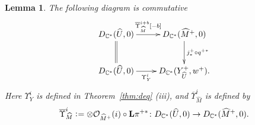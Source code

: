 \documentclass[11pt]{amsart}
\theoremstyle{plain}
\newtheorem{lem}[thm]{Lemma}
\newcommand{\oO}{\mathcal{O}}
\newcommand{\dL}{\mathbf{L}}
\begin{document}
\begin{lem}\label{lem:commute3}
The following diagram is commutative
\begin{align}\label{dia:commute3}
\xymatrix{
D_{\mathbb{C}^{\ast}}(\widehat{U}, 0)
\ar[r]^-{\overline{\Upsilon}_{\widehat{M}}^{i+b}[-b]} \ar@{=}[d] & D_{\mathbb{C}^{\ast}}(\widehat{M}^{+}, 0) 
\ar[d]^-{j^{+}_{\ast}\circ q^{+\ast}} \\
D_{\mathbb{C}^{\ast}}(\widehat{U}, 0) \ar[r]_-{\Upsilon_Y^i} & 
D_{\mathbb{C}^{\ast}}(Y_{\widehat{U}}^+, w^+).
}
\end{align}
Here $\Upsilon_Y^i$ is defined in Theorem~\ref{thm:deq} (iii), 
and $\overline{\Upsilon}_{\widehat{M}}^i$ is defined by
\begin{align}\label{UMi}
\overline{\Upsilon}_{\widehat{M}}^i 
\cneq \otimes \oO_{\widehat{M}^{+}}(i) \circ \dL \pi^{+\ast} \colon 
D_{\mathbb{C}^{\ast}}(\widehat{U}, 0) \to 
D_{\mathbb{C}^{\ast}}(\widehat{M}^{+}, 0). 
\end{align}
\end{lem}
\end{document}
